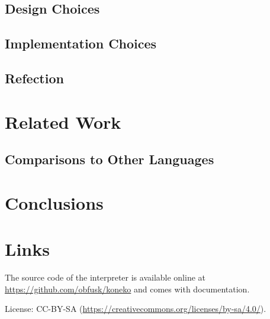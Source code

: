 \documentclass[a4paper,twocolumn]{article}
\begin{document}
\subsection*{Design Choices}

\subsection*{Implementation Choices}

\subsection*{Refection}

\section{Related Work}


\subsection*{Comparisons to Other Languages}

\section{Conclusions}

\section{Links}

The source code of the interpreter is available online at
\url{https://github.com/obfusk/koneko} and comes with documentation.


% 
% 

\small

License: CC-BY-SA
(\url{https://creativecommons.org/licenses/by-sa/4.0/}).
\end{document}
